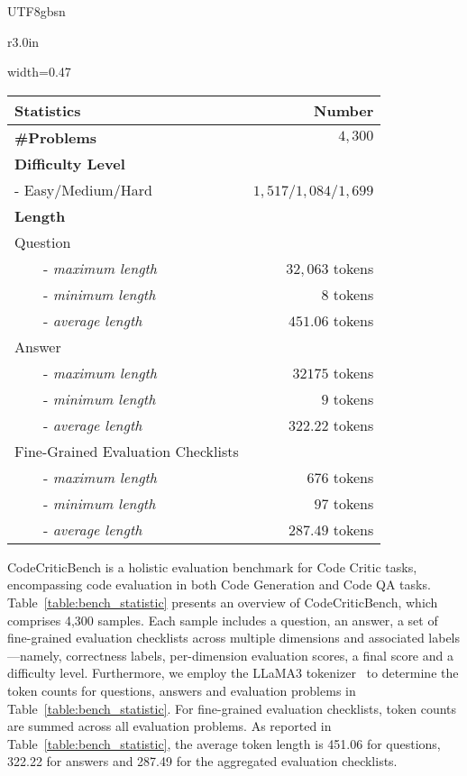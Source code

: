 \documentclass[11pt, a4paper, logo, copyright, nonumbering, amsart]{map}
\begin{document}
\begin{CJK*}{UTF8}{gbsn}
\begin{wraptable}{r}{3.0in}
    \vspace{-0.2in}
    \centering \caption{Dataset statistics of CodeCriticBench.} \label{table:bench_statistic}
    \begin{adjustbox}{width=0.47\textwidth}
    \begin{tabular}{lr}
        \hline
        \toprule
        \textbf{Statistics} & \textbf{Number} \\
        \midrule
        \textbf{\#Problems} & $4,300$ \\
        \midrule
        \textbf{Difficulty Level} & \\
        - Easy/Medium/Hard & $1,517$/$1,084$/$1,699$ \\
        \midrule
        \textbf{Length} \\
        Question \\
        ~~~~- \textit{maximum length}   & $32,063$ tokens \\
        ~~~~- \textit{minimum length}   & $8$ tokens \\
        ~~~~- \textit{average length}   & $451.06$ tokens \\
        Answer \\
        ~~~~- \textit{maximum length}   & $32175$ tokens \\
        ~~~~- \textit{minimum length}   & $9$ tokens \\
        ~~~~- \textit{average length}   & $322.22$ tokens \\
        Fine-Grained Evaluation Checklists \\
        ~~~~- \textit{maximum length}   & $676$ tokens \\
        ~~~~- \textit{minimum length}   & $97$ tokens \\
        ~~~~- \textit{average length}   & $287.49$ tokens \\
        \bottomrule
        \hline
    \end{tabular}
    \end{adjustbox}
\end{wraptable}

CodeCriticBench is a holistic evaluation benchmark for Code Critic tasks, encompassing code evaluation in both Code Generation and Code QA tasks. Table~\ref{table:bench_statistic} presents an overview of CodeCriticBench, which comprises 4,300 samples. Each sample includes a question, an answer, a set of fine-grained evaluation checklists across multiple dimensions and associated labels—namely, correctness labels, per-dimension evaluation scores, a final score and a difficulty level. Furthermore, we employ the LLaMA3 tokenizer~\cite{dubey2024llama} to determine the token counts for questions, answers and evaluation problems in Table~\ref{table:bench_statistic}. 
For fine-grained evaluation checklists, token counts are summed across all evaluation problems. As reported in Table~\ref{table:bench_statistic}, the average token length is 451.06 for questions, 322.22 for answers and 287.49 for the aggregated evaluation checklists.


\end{CJK*}
\end{document}
